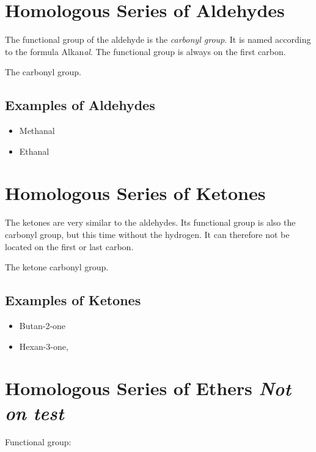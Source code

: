 \documentclass[11pt,twoside]{article}
\begin{document}
	\tableofcontents
	\section{Homologous Series of Aldehydes}
		The functional group of the aldehyde is the \emph{carbonyl group}. It is named according to the formula Alkan\emph{al}. The functional group is always on the first carbon.
		
		
		The carbonyl group.
		
		\subsection{Examples of Aldehydes}
			\begin{itemize}
				\item{ Methanal }
				\item{ Ethanal }
			\end{itemize}
			
	\section{Homologous Series of Ketones}
		The ketones are very similar to the aldehydes. Its functional group is also the carbonyl group, but this time without the hydrogen. It can therefore not be located on the first or last carbon.
		
		
		The ketone carbonyl group.
		
		\subsection{Examples of Ketones}
			\begin{itemize}
				\item{Butan-2-one  }
				\item{Hexan-3-one,  }
			\end{itemize}
			
	\section{Homologous Series of Ethers \emph{Not on test}}
		Functional group:
		
\end{document}
